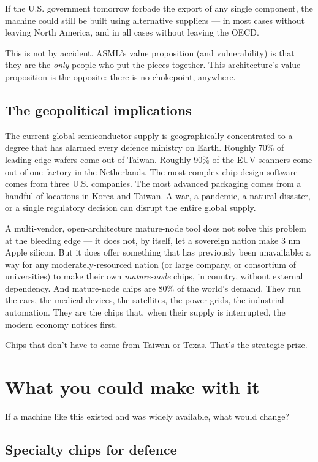 \documentclass[11pt,letterpaper]{article}
\begin{document}
If the U.S. government tomorrow forbade the export of any single component, the machine could still be built using alternative suppliers --- in most cases without leaving North America, and in all cases without leaving the OECD.

This is not by accident. ASML's value proposition (and vulnerability) is that they are the \emph{only} people who put the pieces together. This architecture's value proposition is the opposite: there is no chokepoint, anywhere.

\subsection{The geopolitical implications}

The current global semiconductor supply is geographically concentrated to a degree that has alarmed every defence ministry on Earth. Roughly 70\% of leading-edge wafers come out of Taiwan. Roughly 90\% of the EUV scanners come out of one factory in the Netherlands. The most complex chip-design software comes from three U.S. companies. The most advanced packaging comes from a handful of locations in Korea and Taiwan. A war, a pandemic, a natural disaster, or a single regulatory decision can disrupt the entire global supply.

A multi-vendor, open-architecture mature-node tool does not solve this problem at the bleeding edge --- it does not, by itself, let a sovereign nation make 3 nm Apple silicon. But it does offer something that has previously been unavailable: a way for any moderately-resourced nation (or large company, or consortium of universities) to make their own \emph{mature-node} chips, in country, without external dependency. And mature-node chips are 80\% of the world's demand. They run the cars, the medical devices, the satellites, the power grids, the industrial automation. They are the chips that, when their supply is interrupted, the modern economy notices first.

Chips that don't have to come from Taiwan or Texas. That's the strategic prize.

\section{What you could make with it}

If a machine like this existed and was widely available, what would change?

\subsection{Specialty chips for defence}
\end{document}

